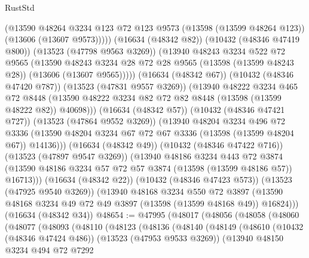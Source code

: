 \begin{lexlean}{RustStd}
\begin{coremodule}
                  (@13590
                    @48264
                    @3234
                    @123
                    @72
                    @123
                    @9573
                    (@13598 (@13599 @48264 @123))
                    (@13606 (@13607 @9573)))))
              (@16634 (@48342 @82))
              (@10432 (@48346 @47419 @800))
              (@13523 (@47798 @9563 @3269))
              (@13940
                @48243
                @3234
                @522
                @72
                @9565
                (@13590
                  @48243
                  @3234
                  @28
                  @72
                  @28
                  @9565
                  (@13598 (@13599 @48243 @28))
                  (@13606 (@13607 @9565)))))
            (@16634 (@48342 @67))
            (@10432 (@48346 @47420 @787))
            (@13523 (@47831 @9557 @3269))
            (@13940
              @48222
              @3234
              @465
              @72
              @8448
              (@13590 @48222 @3234 @82 @72 @82 @8448 (@13598 (@13599 @48222 @82)) @40698)))
          (@16634 (@48342 @57))
          (@10432 (@48346 @47421 @727))
          (@13523 (@47864 @9552 @3269))
          (@13940
            @48204
            @3234
            @496
            @72
            @3336
            (@13590 @48204 @3234 @67 @72 @67 @3336 (@13598 (@13599 @48204 @67)) @14136)))
        (@16634 (@48342 @49))
        (@10432 (@48346 @47422 @716))
        (@13523 (@47897 @9547 @3269))
        (@13940
          @48186
          @3234
          @443
          @72
          @3874
          (@13590 @48186 @3234 @57 @72 @57 @3874 (@13598 (@13599 @48186 @57)) @16713)))
      (@16634 (@48342 @22))
      (@10432 (@48346 @47423 @573))
      (@13523 (@47925 @9540 @3269))
      (@13940
        @48168
        @3234
        @550
        @72
        @3897
        (@13590 @48168 @3234 @49 @72 @49 @3897 (@13598 (@13599 @48168 @49)) @16824)))
    (@16634 (@48342 @34))
@48654 := @47995
    (@48017
      (@48056
        (@48058
          (@48060
            (@48077
              (@48093
                (@48110
                  (@48123
                    (@48136
                      (@48140
                        (@48149
                          (@48610
                            (@10432 (@48346 @47424 @486))
                            (@13523 (@47953 @9533 @3269))
                            (@13940
                              @48150
                              @3234
                              @494
                              @72
                              @7292

\end{coremodule}
\end{lexlean}
